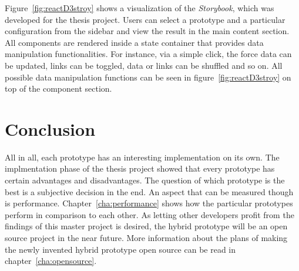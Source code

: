 Figure~\ref{fig:reactD3stroy} shows a visualization of the \emph{Storybook}, which was developed for the thesis project. Users can select a prototype and a particular configuration from the sidebar and view the result in the main content section. All components are rendered inside a state container that provides data manipulation functionalities. For instance, via a simple click, the force data can be updated, links can be toggled, data or links can be shuffled and so on. All possible data manipulation functions can be seen in figure~\ref{fig:reactD3stroy} on top of the component section.

\section{Conclusion}

All in all, each prototype has an interesting implementation on its own. The implmentation phase of the thesis project showed that every prototype has certain advantages and disadvantages. The question of which prototype is the best is a subjective decision in the end. An aspect that can be measured though is performance. Chapter~\ref{cha:performance} shows how the particular prototypes perform in comparison to each other. As letting other developers profit from the findings of this master project is desired, the hybrid prototype will be an open source project in the near future. More information about the plans of making the newly invented hybrid prototype open source can be read in chapter~\ref{cha:opensource}.